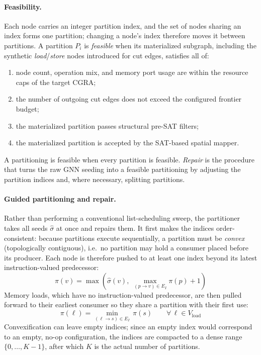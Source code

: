 \documentclass[runningheads]{llncs}
\begin{document}
\paragraph{Feasibility.}
Each node carries an integer partition index, and the set of nodes sharing an index forms one partition; changing a node's index therefore moves it between partitions. A partition $P_i$ is \emph{feasible} when its materialized subgraph, including the synthetic \textit{load}/\textit{store} nodes introduced for cut edges, satisfies all of:
\begin{enumerate}
    \item node count, operation mix, and memory port usage are within the resource caps of the target CGRA;
    \item the number of outgoing cut edges does not exceed the configured frontier budget;
    \item the materialized partition passes structural pre-SAT filters;
    \item the materialized partition is accepted by the SAT-based spatial mapper.
\end{enumerate}
A partitioning is feasible when every partition is feasible. \emph{Repair} is the procedure that turns the raw GNN seeding into a feasible partitioning by adjusting the partition indices and, where necessary, splitting partitions.

\paragraph{Guided partitioning and repair.}
Rather than performing a conventional list-scheduling sweep, the partitioner takes all seeds $\hat{\sigma}$ at once and repairs them. It first makes the indices order-consistent: because partitions execute sequentially, a partition must be \emph{convex} (topologically contiguous), i.e.\ no partition may hold a consumer placed before its producer. Each node is therefore pushed to at least one index beyond its latest instruction-valued predecessor:
\begin{equation}
    \pi(v) = \max\!\left(\hat{\sigma}(v),\;
    \max_{(p \to v) \in E_I} \pi(p) + 1\right)
    \label{eq:convex}
\end{equation}
Memory loads, which have no instruction-valued predecessor, are then pulled forward to their earliest consumer so they share a partition with their first use:
\begin{equation}
    \pi(\ell) = \min_{(\ell \to s) \in E_I}\, \pi(s)
    \qquad \forall\, \ell \in V_{\text{load}}
    \label{eq:load-pull}
\end{equation}
Convexification can leave empty indices; since an empty index would correspond to an empty, no-op configuration, the indices are compacted to a dense range $\{0, \ldots, K-1\}$, after which $K$ is the actual number of partitions.
\end{document}
